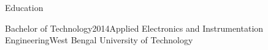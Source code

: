 \documentclass{resume} %
\begin{document}





\begin{rSection}{Education}

\begin{rSubsection}{Bachelor of Technology}{2014}{Applied Electronics and Instrumentation Engineering}{West Bengal University of Technology}
\end{rSubsection}

\end{rSection}
\end{document}
